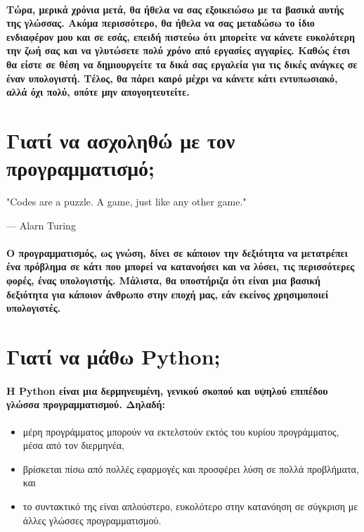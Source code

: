 \documentclass[a4paper,10pt]{report}
\begin{document}
\paragraph{
    Τώρα, μερικά χρόνια μετά, θα ήθελα να σας εξοικειώσω με τα βασικά αυτής
    της γλώσσας. Ακόμα περισσότερο, θα ήθελα να σας μεταδώσω το ίδιο
    ενδιαφέρον μου και σε εσάς, επειδή πιστεύω ότι μπορείτε να κάνετε
    ευκολότερη την ζωή σας και να γλυτώσετε πολύ χρόνο από εργασίες αγγαρίες.
    Καθώς έτσι θα είστε σε θέση να δημιουργείτε τα δικά σας εργαλεία για τις
    δικές ανάγκες σε έναν υπολογιστή. Τέλος, θα πάρει καιρό μέχρι να κάνετε κάτι
    εντυπωσιακό, αλλά όχι πολύ, οπότε μην απογοητευτείτε.
}
\section{Γιατί να ασχοληθώ με τον προγραμματισμό;}
\begin{center}
    \epigraph{
        "Codes are a puzzle. A game, just like any other game."
    }{— Alarn Turing}
\end{center}
\paragraph{
    Ο προγραμματισμός, ως γνώση, δίνει σε κάποιον την δεξιότητα να
    μετατρέπει ένα πρόβλημα σε κάτι που μπορεί να κατανοήσει και να λύσει,
    τις περισσότερες φορές, ένας υπολογιστής. Μάλιστα, θα υποστήριζα ότι
    είναι μια βασική δεξιότητα για κάποιον άνθρωπο στην εποχή μας,
    εάν εκείνος χρησιμοποιεί υπολογιστές.
}
\section{Γιατί να μάθω Python;}
\paragraph{
    Η Python είναι μια δερμηνευμένη, γενικού σκοπού και υψηλού επιπέδου γλώσσα
    προγραμματισμού. Δηλαδή:
}
\begin{itemize}
    \item μέρη προγράμματος μπορούν να εκτελστούν εκτός του κυρίου
          προγράμματος, μέσα από τον διερμηνέα,
    \item βρίσκεται πίσω από πολλές εφαρμογές και προσφέρει λύση σε πολλά
          προβλήματα, και
    \item το συντακτικό της είναι απλούστερο, ευκολότερο στην κατανόηση σε
          σύγκριση με άλλες γλώσσες προγραμματισμού.
\end{itemize}
\end{document}
